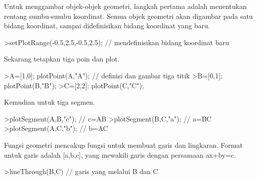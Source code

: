 \documentclass[a4paper,10pt]{article}
\begin{document}
\begin{eulernotebook}
\begin{eulercomment}
\begin{eulercomment}
\begin{eulercomment}
\begin{eulercomment}
\begin{eulercomment}
\begin{eulercomment}
\begin{eulercomment}
\begin{eulercomment}
\begin{eulercomment}
\begin{eulercomment}
\begin{eulercomment}
\begin{eulercomment}
\begin{eulercomment}
\begin{eulercomment}
\begin{eulercomment}
\begin{eulercomment}
\begin{eulercomment}
\begin{eulercomment}
\begin{eulercomment}
\begin{eulercomment}
\begin{eulercomment}
\begin{eulercomment}
\begin{eulercomment}
\begin{eulercomment}
\begin{eulercomment}
\begin{eulercomment}
\begin{eulercomment}
\begin{eulercomment}
\begin{eulercomment}
\begin{eulercomment}
\begin{eulercomment}
\begin{eulercomment}
\begin{eulercomment}
\begin{eulercomment}
\begin{eulercomment}
\begin{eulercomment}
\begin{eulercomment}
\begin{eulercomment}
\begin{eulercomment}
\end{eulercomment}
\begin{eulercomment}
Untuk menggambar objek-objek geometri, langkah pertama adalah menentukan rentang sumbu-sumbu
koordinat. Semua objek geometri akan digambar pada satu bidang koordinat, sampai didefinisikan
bidang koordinat yang baru.
\end{eulercomment}
\begin{eulerprompt}
>setPlotRange(-0.5,2.5,-0.5,2.5); // mendefinisikan bidang koordinat baru 
\end{eulerprompt}
\begin{eulercomment}
Sekarang tetapkan tiga poin dan plot.
\end{eulercomment}
\begin{eulerprompt}
>A=[1,0]; plotPoint(A,"A"); // definisi dan gambar tiga titik
>B=[0,1]; plotPoint(B,"B");
>C=[2,2]; plotPoint(C,"C");
\end{eulerprompt}
\begin{eulercomment}
Kemudian untuk tiga segmen.
\end{eulercomment}
\begin{eulerprompt}
>plotSegment(A,B,"c"); // c=AB
>plotSegment(B,C,"a"); // a=BC
>plotSegment(A,C,"b"); // b=AC
\end{eulerprompt}
\begin{eulercomment}
Fungsi geometri mencakup fungsi untuk membuat garis dan lingkaran.
Format untuk garis adalah [a,b,c], yang mewakili garis dengan
persamaan ax+by=c.
\end{eulercomment}
\begin{eulerprompt}
>lineThrough(B,C) // garis yang melalui B dan C

\end{eulerprompt}
\end{eulercomment}
\end{eulercomment}
\end{eulercomment}
\end{eulercomment}
\end{eulercomment}
\end{eulercomment}
\end{eulercomment}
\end{eulercomment}
\end{eulercomment}
\end{eulercomment}
\end{eulercomment}
\end{eulercomment}
\end{eulercomment}
\end{eulercomment}
\end{eulercomment}
\end{eulercomment}
\end{eulercomment}
\end{eulercomment}
\end{eulercomment}
\end{eulercomment}
\end{eulercomment}
\end{eulercomment}
\end{eulercomment}
\end{eulercomment}
\end{eulercomment}
\end{eulercomment}
\end{eulercomment}
\end{eulercomment}
\end{eulercomment}
\end{eulercomment}
\end{eulercomment}
\end{eulercomment}
\end{eulercomment}
\end{eulercomment}
\end{eulercomment}
\end{eulercomment}
\end{eulercomment}
\end{eulercomment}
\end{eulernotebook}
\end{document}
